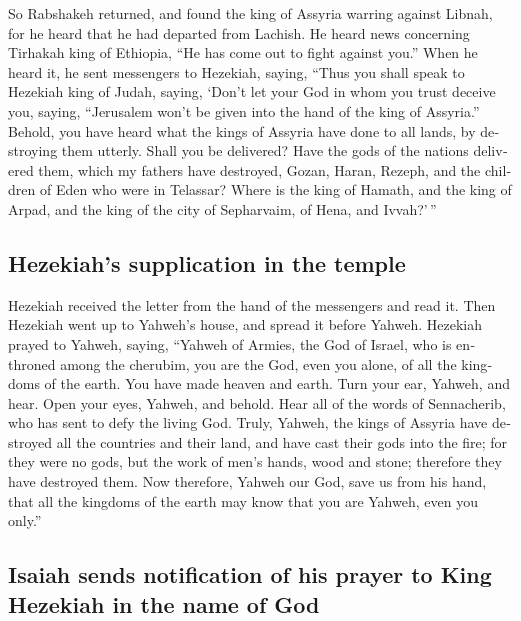\begin{paracol}{2}
\begin{otherlanguage}{english}
 So Rabshakeh returned, and found the king of Assyria
warring against Libnah, for he heard that he had departed from Lachish.
 He heard news concerning Tirhakah king of Ethiopia, ``He
has come out to fight against you.'' When he heard it, he sent
messengers to Hezekiah, saying,  ``Thus you shall speak
to Hezekiah king of Judah, saying, `Don't let your God in whom you trust
deceive you, saying, ``Jerusalem won't be given into the hand of the
king of Assyria.''  Behold, you have heard what the kings
of Assyria have done to all lands, by destroying them utterly. Shall you
be delivered?  Have the gods of the nations delivered
them, which my fathers have destroyed, Gozan, Haran, Rezeph, and the
children of Eden who were in Telassar?  Where is the king
of Hamath, and the king of Arpad, and the king of the city of
Sepharvaim, of Hena, and Ivvah?'\,''

\hypertarget{hezekiahs-supplication-in-the-temple}{%
\subsection{Hezekiah's supplication in the
temple}\label{hezekiahs-supplication-in-the-temple}}

 Hezekiah received the letter from the hand of the
messengers and read it. Then Hezekiah went up to Yahweh's house, and
spread it before Yahweh.  Hezekiah prayed to Yahweh,
saying,  ``Yahweh of Armies, the God of Israel, who is
enthroned among the cherubim, you are the God, even you alone, of all
the kingdoms of the earth. You have made heaven and earth.
 Turn your ear, Yahweh, and hear. Open your eyes, Yahweh,
and behold. Hear all of the words of Sennacherib, who has sent to defy
the living God.  Truly, Yahweh, the kings of Assyria have
destroyed all the countries and their land,  and have
cast their gods into the fire; for they were no gods, but the work of
men's hands, wood and stone; therefore they have destroyed them.
 Now therefore, Yahweh our God, save us from his hand,
that all the kingdoms of the earth may know that you are Yahweh, even
you only.''

\hypertarget{isaiah-sends-notification-of-his-prayer-to-king-hezekiah-in-the-name-of-god}{%
\subsection{Isaiah sends notification of his prayer to King Hezekiah in
the name of
God}\label{isaiah-sends-notification-of-his-prayer-to-king-hezekiah-in-the-name-of-god}}


\end{otherlanguage}
\end{paracol}
